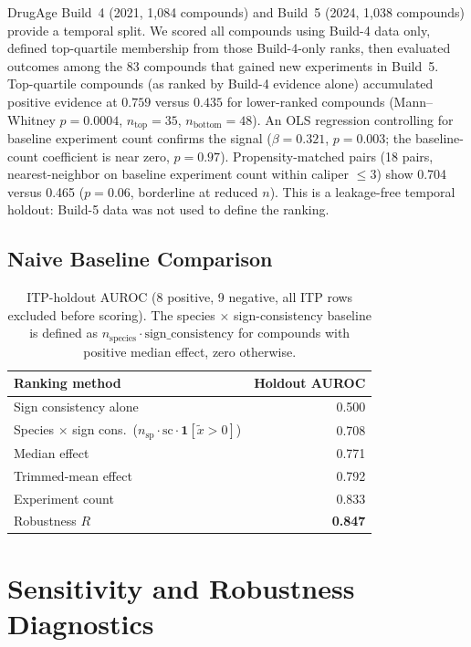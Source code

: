 \documentclass[10pt]{article}
\begin{document}
DrugAge Build~4 (2021, 1{,}084 compounds) and Build~5 (2024, 1{,}038 compounds) provide a temporal split. We scored all compounds using Build-4 data only, defined top-quartile membership from those Build-4-only ranks, then evaluated outcomes among the 83 compounds that gained new experiments in Build~5. Top-quartile compounds (as ranked by Build-4 evidence alone) accumulated positive evidence at $0.759$ versus $0.435$ for lower-ranked compounds (Mann--Whitney $p = 0.0004$, $n_{\text{top}} = 35$, $n_{\text{bottom}} = 48$). An OLS regression controlling for baseline experiment count confirms the signal ($\beta = 0.321$, $p = 0.003$; the baseline-count coefficient is near zero, $p = 0.97$). Propensity-matched pairs (18 pairs, nearest-neighbor on baseline experiment count within caliper $\leq 3$) show 0.704 versus 0.465 ($p = 0.06$, borderline at reduced $n$). This is a leakage-free temporal holdout: Build-5 data was not used to define the ranking.

\subsection{Naive Baseline Comparison}

\begin{table}[H]
\centering
\scriptsize
\begin{tabular}{lr}
\toprule
Ranking method & Holdout AUROC \\
\midrule
Sign consistency alone & 0.500 \\
Species $\times$ sign cons.\ ($n_{\text{sp}} \cdot \text{sc} \cdot \mathbf{1}[\tilde{x}>0]$) & 0.708 \\
Median effect & 0.771 \\
Trimmed-mean effect & 0.792 \\
Experiment count & 0.833 \\
Robustness $R$ & \textbf{0.847} \\
\bottomrule
\end{tabular}
\caption{ITP-holdout AUROC (8 positive, 9 negative, all ITP rows excluded before scoring). The species $\times$ sign-consistency baseline is defined as $n_{\text{species}} \cdot \text{sign\_consistency}$ for compounds with positive median effect, zero otherwise.}
\label{tab:baselines}
\end{table}

\section{Sensitivity and Robustness Diagnostics}
\end{document}
